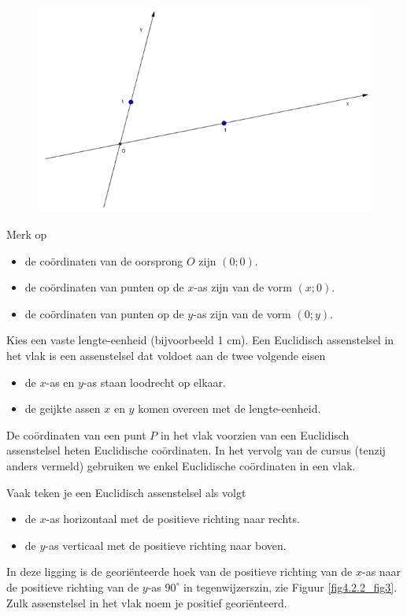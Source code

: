 \begin{figure}[!htb]
\begin{center}
\includegraphics[height=5 cm]{4_opp_inhoud_an_meetk/inputs/AMTekst2Fig2}
\caption{}
\label{fig4.2.2_fig2}
\end{center}
\end{figure}

Merk op
\begin{itemize}
\item de co\"ordinaten van de oorsprong $O$ zijn $(0;0)$.
\item de co\"ordinaten van punten op de $x$-as zijn van de vorm $(x;0)$.
\item de co\"ordinaten van punten op de $y$-as zijn van de vorm $(0;y)$.
\end{itemize}

Kies een vaste lengte-eenheid (bijvoorbeeld 1 cm).
Een Euclidisch assenstelsel in het vlak is een assenstelsel dat voldoet aan de twee volgende eisen
\begin{itemize}
\item de $x$-as en $y$-as staan loodrecht op elkaar.
\item de geijkte assen $x$ en $y$ komen overeen met de lengte-eenheid.
\end{itemize}
De co\"ordinaten van een punt $P$ in het vlak voorzien van een Euclidisch assenstelsel heten Euclidische co\"ordinaten.
In het vervolg van de cursus (tenzij anders vermeld) gebruiken we enkel Euclidische co\"ordinaten in een vlak.

Vaak teken je een Euclidisch assenstelsel als volgt
\begin{itemize}
\item de $x$-as horizontaal met de positieve richting naar rechts.
\item de $y$-as verticaal met de positieve richting naar boven.
\end{itemize}
In deze ligging is de georiënteerde hoek van de positieve richting van de $x$-as naar de positieve richting van de $y$-as $90^{\circ}$ in tegenwijzerszin, zie Figuur \ref{fig4.2.2_fig3}.
Zulk assenstelsel in het vlak noem je positief geori\"enteerd.

